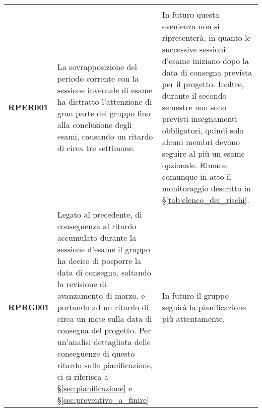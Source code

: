 \documentclass[../piano-di-progetto]{subfiles}
\begin{document}
\begin{longtable}[H]{|p{10em}|p{17em}|p{17em}|}
  \rowcolor{darkgray!90!}
  \color{white}{\textbf{Rischio}} & \color{white}{\textbf{Gestione}}                                                                                                                                                                                                                                                                                                                                                                                                            & \color{white}{\textbf{Monitoraggio}}                                                                                                                                                                                                                                                                                                                                                         \\
  \textbf{RPER001}                & La sovrapposizione del periodo corrente con la sessione invernale di esame ha distratto l'attenzione di gran parte del gruppo fino alla conclusione degli esami, causando un ritardo di circa tre settimane.                                                                                                                                                                                                                                 & In futuro questa evenienza non si ripresenterà, in quanto le successive sessioni d'esame iniziano dopo la data di consegna prevista per il progetto. Inoltre, durante il secondo semestre non sono previsti insegnamenti obbligatori, quindi solo alcuni membri devono seguire al più un esame opzionale. Rimane comunque in atto il monitoraggio descritto in §\ref{tab:elenco_dei_rischi}. \\
  \textbf{RPRG001}                & Legato al precedente, di conseguenza al ritardo accumulato durante la sessione d'esame il gruppo ha deciso di posporre la data di consegna, saltando la revisione di avanzamento di marzo, e portando ad un ritardo di circa un mese sulla data di consegna del progetto. Per un'analisi dettagliata delle conseguenze di questo ritardo sulla pianificazione, ci si riferisca a §\ref{sec:pianificazione} e §\ref{sec:preventivo_a_finire} & In futuro il gruppo seguirà la pianificazione più attentamente.                                                                                                                                                                                                                                                                                                                             \\

\end{longtable}
\end{document}
